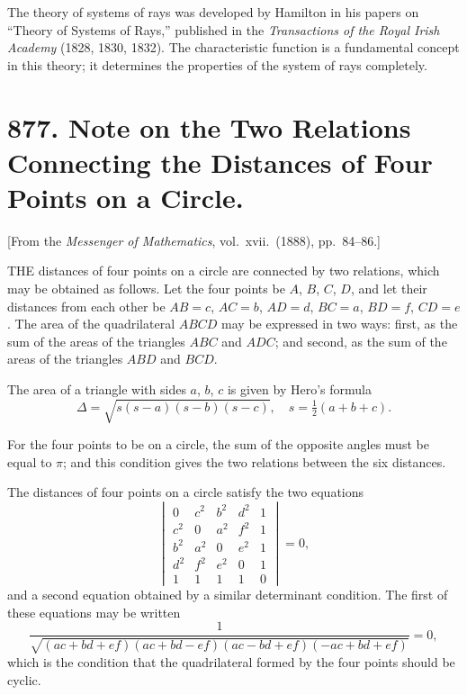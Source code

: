 \documentclass[11pt,a4paper]{book}
\begin{document}
The theory of systems of rays was developed by Hamilton in his papers on ``Theory of Systems of Rays,'' published in the \textit{Transactions of the Royal Irish Academy} (1828, 1830, 1832). The characteristic function is a fundamental concept in this theory; it determines the properties of the system of rays completely.

\newpage
\section[877]{877. Note on the Two Relations Connecting the Distances of Four Points on a Circle.}
\label{sec:877}

[From the \textit{Messenger of Mathematics}, vol.\ xvii.\ (1888), pp.\ 84--86.]

\medskip\noindent
THE distances of four points on a circle are connected by two relations, which may be obtained as follows. Let the four points be $A$, $B$, $C$, $D$, and let their distances from each other be $AB = c$, $AC = b$, $AD = d$, $BC = a$, $BD = f$, $CD = e$. The area of the quadrilateral $ABCD$ may be expressed in two ways: first, as the sum of the areas of the triangles $ABC$ and $ADC$; and second, as the sum of the areas of the triangles $ABD$ and $BCD$.

The area of a triangle with sides $a$, $b$, $c$ is given by Hero's formula
\[
\Delta = \sqrt{s(s-a)(s-b)(s-c)}, \quad s = \tfrac{1}{2}(a+b+c).
\]

For the four points to be on a circle, the sum of the opposite angles must be equal to $\pi$; and this condition gives the two relations between the six distances.

\medskip\noindent
The distances of four points on a circle satisfy the two equations
\[
\begin{vmatrix}
0 & c^{2} & b^{2} & d^{2} & 1 \\
c^{2} & 0 & a^{2} & f^{2} & 1 \\
b^{2} & a^{2} & 0 & e^{2} & 1 \\
d^{2} & f^{2} & e^{2} & 0 & 1 \\
1 & 1 & 1 & 1 & 0
\end{vmatrix} = 0,
\]
and a second equation obtained by a similar determinant condition. The first of these equations may be written
\[
\frac{1}{\sqrt{(ac+bd+ef)(ac+bd-ef)(ac-bd+ef)(-ac+bd+ef)}} = 0,
\]
which is the condition that the quadrilateral formed by the four points should be cyclic.
\end{document}
